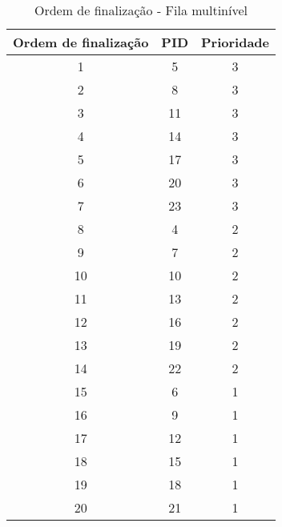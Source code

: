 \documentclass{article}
\begin{document}
\begin{table}[H]
      \centering
      \begin{tabular}{|c|c|c|}
            \hline
            \textbf{Ordem de finalização} & \textbf{PID} & \textbf{Prioridade}
            \\
            \hline
            1                             & 5            & 3
            \\
            2                             & 8            & 3
            \\
            3                             & 11           & 3
            \\
            4                             & 14           & 3
            \\
            5                             & 17           & 3
            \\
            6                             & 20           & 3
            \\
            7                             & 23           & 3
            \\
            8                             & 4            & 2
            \\
            9                             & 7            & 2
            \\
            10                            & 10           & 2
            \\
            11                            & 13           & 2
            \\
            12                            & 16           & 2
            \\
            13                            & 19           & 2
            \\
            14                            & 22           & 2
            \\
            15                            & 6            & 1
            \\
            16                            & 9            & 1
            \\
            17                            & 12           & 1
            \\
            18                            & 15           & 1
            \\
            19                            & 18           & 1
            \\
            20                            & 21           & 1
            \\
            \hline
      \end{tabular}
      \caption{Ordem de finalização - Fila multinível}
      \label{tab:indexedtable}
\end{table}
\end{document}
